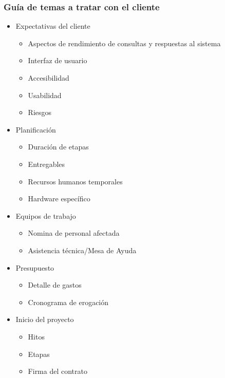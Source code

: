 \subsubsection{Guía de temas a tratar con el cliente}
\begin{itemize}
\item Expectativas del cliente
	\begin{itemize}
		\item Aspectos de rendimiento de consultas y respuestas al sistema
		\item Interfaz de usuario
		\item Accesibilidad
        \item Usabilidad
		\item Riesgos
	\end{itemize}
\item Planificación
	\begin{itemize}
		\item Duración de etapas
        \item Entregables
        \item Recursos humanos temporales
        \item Hardware específico
	\end{itemize}
\item Equipos de trabajo
	\begin{itemize}
		\item Nomina de personal afectada
		\item Asistencia técnica/Mesa de Ayuda
	\end{itemize}
\item Presupuesto
	\begin{itemize}
		\item Detalle de gastos
		\item Cronograma de erogación
	\end{itemize}
\item Inicio del proyecto
	\begin{itemize}
		\item Hitos
		\item Etapas
		\item Firma del contrato
	\end{itemize}
\end{itemize}

